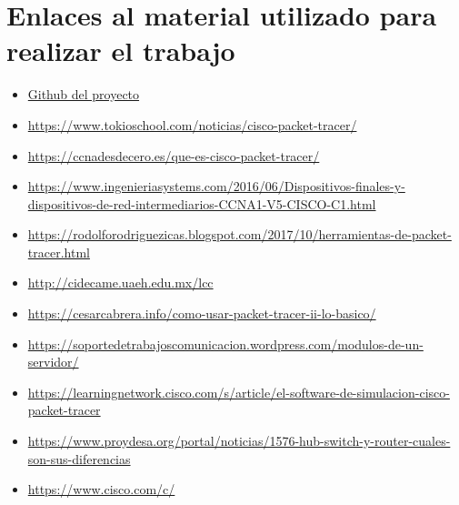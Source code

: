 \documentclass{article}
\begin{document}
\section{Enlaces al material utilizado para realizar el trabajo}
\begin{itemize}
    \item \href{https://github.com/occtarc/Introduccion-a-Packet-Tracer}{Github del proyecto}
    \item \href{https://www.tokioschool.com/noticias/cisco-packet-tracer/}{https://www.tokioschool.com/noticias/cisco-packet-tracer/}
    \item \href{https://ccnadesdecero.es/que-es-cisco-packet-tracer/}{https://ccnadesdecero.es/que-es-cisco-packet-tracer/}
    \item \href{https://www.ingenieriasystems.com/2016/06/Dispositivos-finales-y-dispositivos-de-red-intermediarios-CCNA1-V5-CISCO-C1.html}{https://www.ingenieriasystems.com/2016/06/Dispositivos-finales-y-dispositivos-de-red-intermediarios-CCNA1-V5-CISCO-C1.html}
    \item \href{https://rodolforodriguezicas.blogspot.com/2017/10/herramientas-de-packet-tracer.html}{https://rodolforodriguezicas.blogspot.com/2017/10/herramientas-de-packet-tracer.html}
    \item \href{http://cidecame.uaeh.edu.mx/lcc/mapa/PROYECTO/libro35/141_estructura_de_la_red.html#:~:text=Algunos%20ejemplos%20de%20dispositivos%20finales,Impresoras%20de%20red}{http://cidecame.uaeh.edu.mx/lcc}
    \item \href{https://cesarcabrera.info/como-usar-packet-tracer-ii-lo-basico/}{https://cesarcabrera.info/como-usar-packet-tracer-ii-lo-basico/}
    \item \href{https://soportedetrabajoscomunicacion.wordpress.com/modulos-de-un-servidor/}{https://soportedetrabajoscomunicacion.wordpress.com/modulos-de-un-servidor/}
    \item \href{https://learningnetwork.cisco.com/s/article/el-software-de-simulacion-cisco-packet-tracer}{https://learningnetwork.cisco.com/s/article/el-software-de-simulacion-cisco-packet-tracer}
    \item \href{https://www.proydesa.org/portal/noticias/1576-hub-switch-y-router-cuales-son-sus-diferencias}{https://www.proydesa.org/portal/noticias/1576-hub-switch-y-router-cuales-son-sus-diferencias}
    \item \href{https://www.cisco.com/c/dam/global/es_mx/assets/ofertas/desconectadosanonimos/routing/pdfs/brochure_redes.pdf}{https://www.cisco.com/c/}

\end{itemize}
\end{document}
